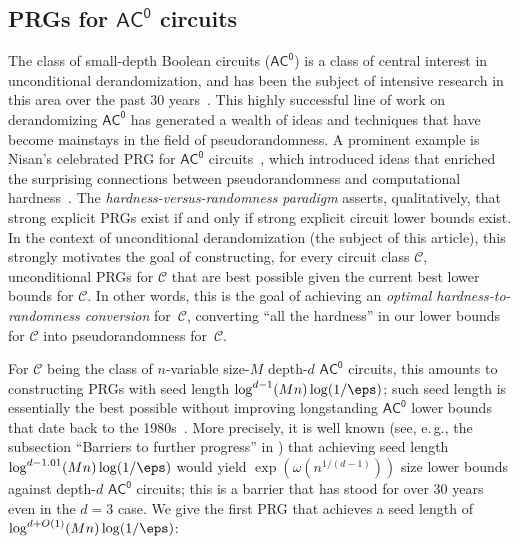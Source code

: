 \documentclass[11pt]{article}
\numberwithin{equation}{section}
\theoremstyle{definition}
\theoremstyle{plain}
\newcommand{\eg}{e.\,g.}
\theoremstyle{plain}
\newcommand{\acz}{\mathsf{AC^0}}
\begin{document}
\subsection{PRGs for $\acz$ circuits} \label{sec:acz}

 
The class of small-depth Boolean circuits ($\acz$) is a class of central interest in unconditional derandomization, and has been the subject of  intensive research in this area over the past 30 years~\cite{AjtaiWigderson:85,LinialNisan:90,Nis91,NW94,LVW93,LV96,Kli01,Trevisan:04,Vio06,Baz09,Raz09,Bra10,KLW10,DETT10,Aaronson10,Aaronson10b,SimaZak10,LS11,FSUV12,GMRTV12,GMR13,TX13,GW14,Tal:15tightbounds,HS16journal,CHHL18journal}. 
This highly successful line of work on derandomizing $\acz$ has generated a wealth of ideas and techniques that have become mainstays in the field of pseudorandomness. A prominent example is Nisan's celebrated PRG for $\acz$ circuits~\cite{Nis91}, which introduced ideas that enriched the surprising connections between pseudorandomness and computational hardness~\cite{blumic82,Yao:82,NW94}.  The \emph{hardness-versus-randomness paradigm} asserts, qualitatively, that strong explicit PRGs exist if and only if strong explicit circuit lower bounds exist.  In the context of unconditional derandomization (the subject of
this %
article),  %
this strongly motivates the goal of constructing, for every 
circuit class $\mathscr{C}$,
%
%
unconditional PRGs for $\mathscr{C}$ that are best possible given the current best lower bounds for $\mathscr{C}$. In other words, this is the goal of achieving %
%
an \emph{optimal  %
%
hardness-to-randomness conversion}   %
for~$\mathscr{C}$, converting ``all the %
hardness''   %
in our lower bounds for $\mathscr{C}$ into pseudorandomness for~$\mathscr{C}$.

For $\mathscr{C}$ being the class of $n$-variable size-$M$ depth-$d$ $\acz$ circuits, %
this amounts to constructing PRGs with seed length 
$\log^{d-1}(Mn)\log(1/\eps)$; %
such seed length is essentially the best possible without improving longstanding $\acz$ lower bounds that date back to the 1980s~\cite{Hastad86}. More precisely, it is well known (see, \eg, the subsection ``Barriers to further progress'' in 
%
 \cite[Section 1]{TX13}) %
that achieving seed length $\log^{d-1.01}(Mn)\log(1/\eps)$ would yield $\exp(\omega(n^{1/(d-1)}))$ %
size lower bounds against depth-$d$ $\acz$ circuits; this is a barrier that has stood for over 30 years even in the $d=3$ case.  We give the first PRG that achieves a seed length of $\log^{d+O(1)}(Mn)\log(1/\eps)$: %
\end{document}
